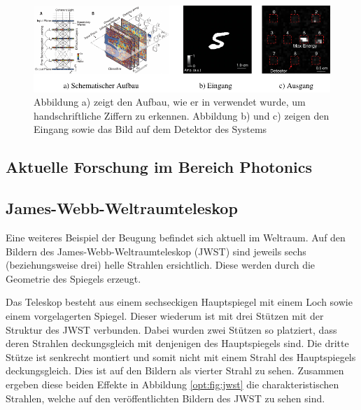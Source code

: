 \begin{figure}
    \centering
    \includegraphics[width=\textwidth]{papers/opt/images/handwriting.pdf}
    \caption{Abbildung a) zeigt den Aufbau, wie er in \cite{opt:Lin.2018} verwendet wurde, um handschriftliche Ziffern zu erkennen.
    Abbildung b) und c) zeigen den Eingang sowie das Bild auf dem Detektor des Systems}
    \label{opt:fig:handwriting}
\end{figure}

\subsection{Aktuelle Forschung im Bereich Photonics}

\subsection{James-Webb-Weltraumteleskop}
Eine weiteres Beispiel der Beugung befindet sich aktuell im Weltraum.
Auf den Bildern des James-Webb-Weltraumteleskop (JWST) sind jeweils sechs (beziehungsweise drei) helle Strahlen ersichtlich.
Diese werden durch die Geometrie des Spiegels erzeugt.

Das Teleskop besteht aus einem sechseckigen Hauptspiegel mit einem Loch sowie einem vorgelagerten Spiegel.
Dieser wiederum ist mit drei Stützen mit der Struktur des JWST verbunden.
Dabei wurden zwei Stützen so platziert, dass deren Strahlen deckungsgleich mit denjenigen des Hauptspiegels sind.
Die dritte Stütze ist senkrecht montiert und somit nicht mit einem Strahl des Hauptspiegels deckungsgleich.
Dies ist auf den Bildern als vierter Strahl zu sehen.
Zusammen ergeben diese beiden Effekte in Abbildung \ref{opt:fig:jwst} die charakteristischen Strahlen, welche auf
den veröffentlichten Bildern des JWST zu sehen sind.

